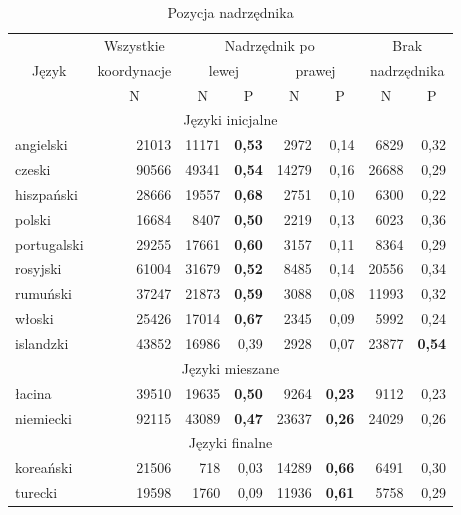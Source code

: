 \begin{table}[h]
\centering
\begin{tabular}{lrrrrrrr}
  \toprule
& \multicolumn{1}{c}{Wszystkie}	& \multicolumn{4}{c}{Nadrzędnik po} 	& \multicolumn{2}{c}{Brak} \\
\multicolumn{1}{c}{Język}	& \multicolumn{1}{c}{koordynacje}	
& \multicolumn{2}{c}{lewej}			& \multicolumn{2}{c}{prawej}	& \multicolumn{2}{c}{nadrzędnika} \\
& \multicolumn{1}{c}{N} & 
\multicolumn{1}{c}{N} & \multicolumn{1}{c}{P} & \multicolumn{1}{c}{N} &
\multicolumn{1}{c}{P} & \multicolumn{1}{c}{N} & \multicolumn{1}{c}{P} \\
\midrule
\multicolumn{8}{c}{Języki inicjalne} \\
\midrule
angielski 	& 21013 & 11171 & \textbf{0,53} & 2972  & 0,14 & 6829  & 0,32 \\
czeski 		& 90566 & 49341 & \textbf{0,54} & 14279 & 0,16 & 26688 & 0,29 \\ 
hiszpański	& 28666 & 19557 & \textbf{0,68} & 2751  & 0,10 & 6300  & 0,22 \\ 
polski 		& 16684 & 8407  & \textbf{0,50} & 2219  & 0,13 & 6023  & 0,36 \\ 
portugalski 	& 29255 & 17661 & \textbf{0,60} & 3157  & 0,11 & 8364  & 0,29 \\  
rosyjski		& 61004 & 31679 & \textbf{0,52} & 8485  & 0,14 & 20556 & 0,34 \\ 
rumuński 	& 37247 & 21873 & \textbf{0,59} & 3088  & 0,08 & 11993 & 0,32 \\
włoski		& 25426 & 17014 & \textbf{0,67} & 2345  & 0,09 & 5992  & 0,24 \\ 
\hdashline 
islandzki 	& 43852 & 16986 & 0,39 & 2928 & 0,07 & 23877 & \textbf{0,54} \\ 
\midrule
\multicolumn{8}{c}{Języki mieszane} \\
\midrule
łacina 		& 39510 & 19635 & \textbf{0,50} & 9264  & \textbf{0,23} & 9112  & 0,23 \\ 
niemiecki 	& 92115 & 43089 & \textbf{0,47} & 23637 & \textbf{0,26} & 24029 & 0,26 \\ 
\midrule
\multicolumn{8}{c}{Języki finalne} \\
\midrule
koreański	& 21506 & 718   & 0,03 & 14289 & \textbf{0,66} & 6491 & 0,30 \\ 
turecki		& 19598 & 1760  & 0,09 & 11936 & \textbf{0,61} & 5758 & 0,29 \\ 
\bottomrule
\end{tabular}
\caption{Pozycja nadrzędnika}
\label{tab:pozycja-nadrzędnika}
\end{table}
